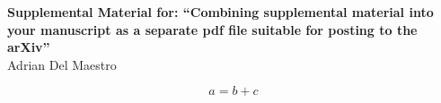 \documentclass[10pt,twocolumn,prl,aps,floatfix,superscriptaddress,longbibliography]{revtex4-1}
\begin{document}
\clearpage
\pagebreak
\setcounter{page}{1}
\onecolumngrid
\widetext
\begin{center}
    \textbf{{\large Supplemental Material for: ``Combining supplemental material into your manuscript as a separate pdf
    file suitable for posting to the arXiv''}}\\[1em]
    Adrian Del Maestro
\end{center}

\lipsum[1-2]

\begin{equation}
    a = b + c
    \label{eq:abc}
\end{equation}

\lipsum*[3-6]\cite{Sengupta:2018pv}\\

\lipsum*[7-12]\cite{Barghathi:2018cu}


\end{document}
